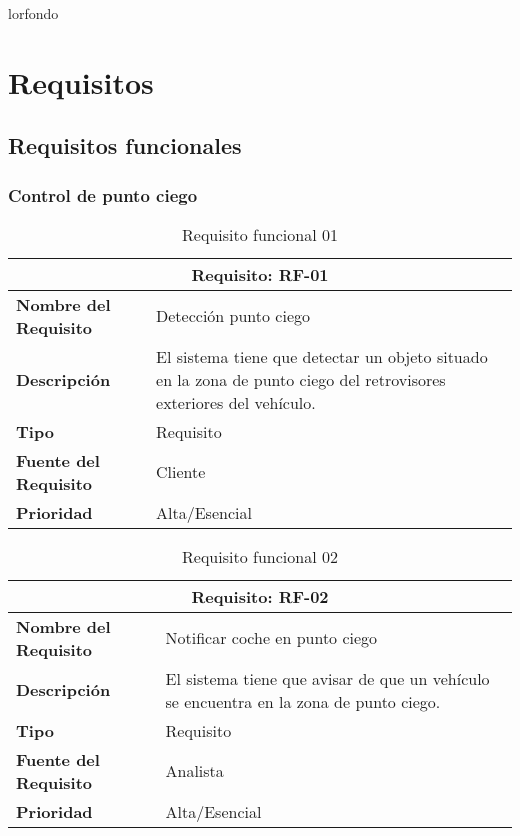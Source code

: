 \documentclass[10pt,a4paper,oldfontcommands]{dpds}
\begin{document}
\pageco
lor{fondo}
\color{principal}


\section{Requisitos}
\subsection{Requisitos funcionales}


\subsubsection{Control de punto ciego}

\begin{table}[H]
\begin{center}
\begin{tabular}{p{} p{7cm}}
\multicolumn{2}{c}{\textbf{Requisito: RF-01} } \\
\hline \hline
\textbf{Nombre del Requisito} & Detección punto ciego  \\
\hline
\textbf{Descripción} & El sistema tiene que detectar un objeto situado en la zona de punto ciego del retrovisores exteriores del vehículo.  \\
\hline
\textbf{Tipo} & Requisito  \\
\hline
\textbf{Fuente del Requisito} & Cliente  \\
\hline
\textbf{Prioridad} & Alta/Esencial  \\ \hline
\end{tabular}
\caption{Requisito funcional 01}
\label{tab:personal}
\end{center}
\end{table}

\begin{table}[H]
\begin{center}
\begin{tabular}{p{} p{7cm}}
\multicolumn{2}{c}{\textbf{Requisito: RF-02} } \\
\hline \hline
\textbf{Nombre del Requisito} & Notificar coche en punto ciego  \\
\hline
\textbf{Descripción} & El sistema tiene que avisar de que un vehículo se encuentra en la zona de punto ciego. \\
\hline
\textbf{Tipo} & Requisito  \\
\hline
\textbf{Fuente del Requisito} & Analista  \\
\hline
\textbf{Prioridad} & Alta/Esencial  \\ \hline
\end{tabular}
\caption{Requisito funcional 02}
\label{tab:personal}
\end{center}
\end{table}
\end{document}

